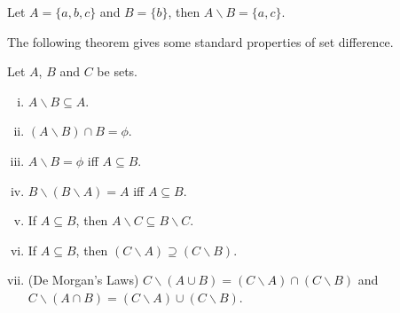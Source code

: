 \documentclass[a4paper,english,12pt]{article}
\begin{document}
\begin{exmp}
Let $A = \{a, b, c\}$ and $B = \{b \}$, then $A \backslash B = \{a, c\}$. 
\end{exmp}

The following theorem gives some standard properties of set difference.
\begin{thm}
 Let $A$, $B$ and $C$ be sets.
 \begin{enumerate}[i)]
  \item $A \backslash B \subseteq A$.
  \item $(A \backslash B) \cap B = \phi$.
  \item $A \backslash B = \phi$ iff $A \subseteq B$.
  \item $B \backslash (B \backslash A) = A$ iff $A \subseteq B$.
  \item If $A \subseteq B$, then $A \backslash C \subseteq B \backslash C$.
  \item If $A \subseteq B$, then $(C \backslash A) \supseteq (C \backslash B)$.
  \item (De Morgan’s Laws) $C \backslash (A \cup B) = (C \backslash A) \cap (C \backslash B)$ and $C \backslash (A \cap B) = (C \backslash A) \cup (C \backslash B)$.
 \end{enumerate}
\end{thm}
\end{document}
